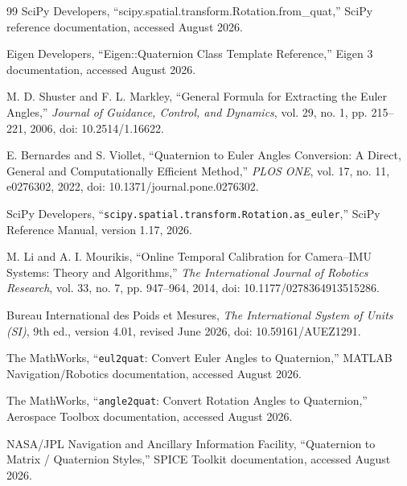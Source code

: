 \documentclass[11pt]{article}
\begin{document}
\begin{thebibliography}{99}
        SciPy Developers,
        ``scipy.spatial.transform.Rotation.from\_quat,''
        SciPy reference documentation, accessed August 2026.

        Eigen Developers,
        ``Eigen::Quaternion Class Template Reference,''
        Eigen 3 documentation, accessed August 2026.


        M. D. Shuster and F. L. Markley,
        ``General Formula for Extracting the Euler Angles,''
        \emph{Journal of Guidance, Control, and Dynamics},
        vol. 29, no. 1, pp. 215--221, 2006,
        doi: 10.2514/1.16622.

        E. Bernardes and S. Viollet,
        ``Quaternion to Euler Angles Conversion: A Direct, General and Computationally
        Efficient Method,''
        \emph{PLOS ONE}, vol. 17, no. 11, e0276302, 2022,
        doi: 10.1371/journal.pone.0276302.

        SciPy Developers,
        ``\texttt{scipy.spatial.transform.Rotation.as\_euler},''
        SciPy Reference Manual, version 1.17, 2026.

        M. Li and A. I. Mourikis,
        ``Online Temporal Calibration for Camera--IMU Systems: Theory and Algorithms,''
        \emph{The International Journal of Robotics Research},
        vol. 33, no. 7, pp. 947--964, 2014,
        doi: 10.1177/0278364913515286.

        Bureau International des Poids et Mesures,
        \emph{The International System of Units (SI)},
        9th ed., version 4.01, revised June 2026,
        doi: 10.59161/AUEZ1291.


        The MathWorks,
        ``\texttt{eul2quat}: Convert Euler Angles to Quaternion,''
        MATLAB Navigation/Robotics documentation, accessed August 2026.

        The MathWorks,
        ``\texttt{angle2quat}: Convert Rotation Angles to Quaternion,''
        Aerospace Toolbox documentation, accessed August 2026.

        NASA/JPL Navigation and Ancillary Information Facility,
        ``Quaternion to Matrix / Quaternion Styles,''
        SPICE Toolkit documentation, accessed August 2026.


\end{thebibliography}
\end{document}
